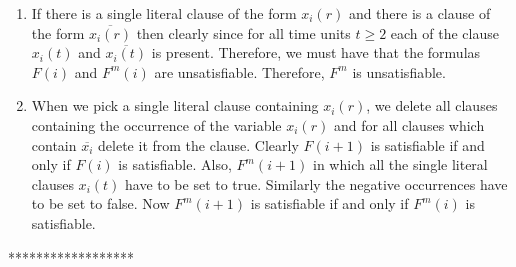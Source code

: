 \begin{enumerate}
\item
If there is a single literal clause of the form $x_i(r)$ and there is a clause
of the form $\overline{x_i(r)}$ then clearly since for all time units
$t \geq 2$ each of 
the clause $x_i(t)$ and $\overline{x_i(t)}$ is present.
Therefore, we must have that the formulas $F(i)$ and  
$F^m(i)$ are  unsatisfiable. Therefore, $F^m$ is unsatisfiable.



\item
When we pick a single literal clause containing $x_i(r)$, we 
delete all clauses containing
the occurrence of the variable $x_i(r)$ and for all clauses which contain
$\overline{x_i}$ delete it from the clause. Clearly $F(i+1)$ is satisfiable
if and only if $F(i)$ is satisfiable. Also, $F^m(i+1)$ in which all the single
literal clauses $x_i(t)$ have to be set to true. Similarly the negative
occurrences have to be set to false. Now $F^m(i+1)$ is satisfiable if and
only if $F^m(i)$ is satisfiable.



\end{enumerate}

******************
\fi



\iffalse*******
Clearly if $F$ is satisfiable then  it is easy to see that 
$F^m$ is satisfiable. Therefore in the remaining we prove the converse.
Suppose at some stage in the execution of the algorithm, it is found that
$F$ is unsatisfiable. We prove the claim by induction. Formally, let
$F(i)$ denote the formula obtained starting from $F$ in $i$ steps. We claim
that $F(i)$ is satisfiable if and only if $F(i-1)$ is satisfiable. 
We prove this by induction. 

\noindent
{\bf Basis:} $F$ is satisfiable if and only if $F(1)$ is  satisfiable.
The only way that $F(1)$ is unsatisfiable is by Step (1a). But this would imply
that $F^m$ is also unsatisfiable.



For proving the statement we need to consider the following cases.

\begin{enumerate}
\item
If there is a single literal clause of the form $x_i(r)$ and there is a clause
of the form $\overline{x_i(r)}$ then clearly since for all time units
$t \geq 2$ each of 
the clause $x_i(t)$ and $\overline{x_i(t)}$ is present.
Therefore, we must have that the formula $F^m$ is unsatisfiable.

\item
When we pick a single literal clause containing $x_i(r)$, we 
delete all clauses containing
the occurrence of the variable $x_i(r)$ and for all clauses which contain
$\overline{x_i}$ delete it from the clause.
\end{enumerate}
*********
\fi



